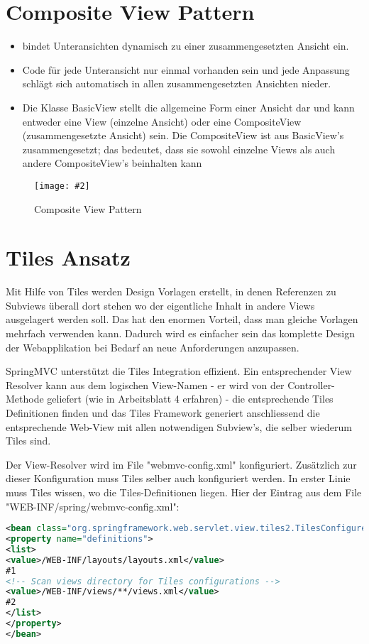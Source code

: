 \documentclass[a4paper,10pt]{scrreprt}
\newcommand{\pic}[2][figure]{\begin{figure}[h]
 \centering
 \texttt{[image: \#2]}
 \caption{#1}
\end{figure}
}
\begin{document}
\section{Composite View Pattern}
\begin{itemize}
 \item bindet Unteransichten dynamisch zu einer zusammengesetzten Ansicht ein.
 \item Code für jede Unteransicht nur einmal vorhanden sein und jede Anpassung schlägt sich automatisch in allen
zusammengesetzten Ansichten nieder.
\item Die Klasse BasicView stellt die allgemeine Form einer Ansicht dar und kann entweder eine View
(einzelne Ansicht) oder eine CompositeView (zusammengesetzte Ansicht) sein. Die
CompositeView ist aus BasicView's zusammengesetzt; das bedeutet, dass sie sowohl einzelne
Views als auch andere CompositeView's beinhalten kann
\end{itemize}
\pic[Composite View Pattern] {compositeview.png}




\section{Tiles Ansatz}
Mit Hilfe von Tiles werden Design Vorlagen erstellt, in denen Referenzen zu Subviews
überall dort stehen wo der eigentliche Inhalt in andere Views ausgelagert werden soll. Das hat den
enormen Vorteil, dass man gleiche Vorlagen mehrfach verwenden kann. Dadurch wird es einfacher
sein das komplette Design der Webapplikation bei Bedarf an neue Anforderungen anzupassen.

SpringMVC unterstützt die Tiles Integration effizient. Ein entsprechender View Resolver kann aus
dem logischen View-Namen - er wird von der Controller-Methode geliefert (wie in Arbeitsblatt 4
erfahren) - die entsprechende Tiles Definitionen finden und das Tiles Framework generiert
anschliessend die entsprechende Web-View mit allen notwendigen Subview's, die selber wiederum
Tiles sind.

Der View-Resolver wird im File "webmvc-config.xml" konfiguriert. Zusätzlich zur dieser
Konfiguration muss Tiles selber auch konfiguriert werden. In erster Linie muss Tiles wissen, wo die
Tiles-Definitionen liegen. Hier der Eintrag aus dem File "WEB-INF/spring/webmvc-config.xml":

\begin{lstlisting}[caption=View Resolver Config Tiles,language=xml]
 <bean class="org.springframework.web.servlet.view.tiles2.TilesConfigurer" id="tilesConfigurer">
<property name="definitions">
<list>
<value>/WEB-INF/layouts/layouts.xml</value>
#1
<!-- Scan views directory for Tiles configurations -->
<value>/WEB-INF/views/**/views.xml</value>
#2
</list>
</property>
</bean>
\end{lstlisting}
\end{document}
